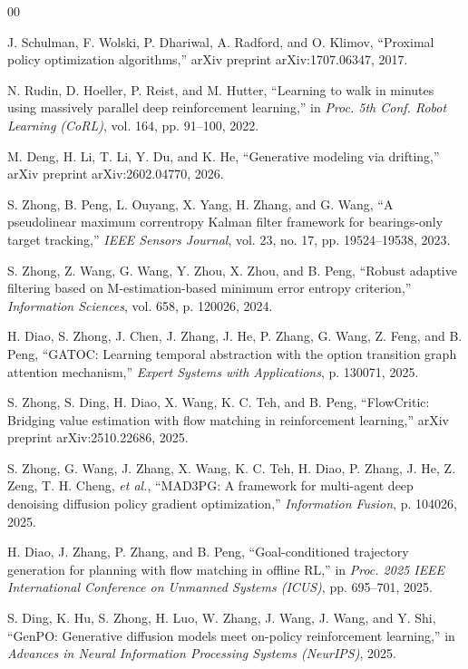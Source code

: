 \documentclass[conference]{IEEEtran}
\begin{document}
\begin{thebibliography}{00}

J. Schulman, F. Wolski, P. Dhariwal, A. Radford, and O. Klimov, 
``Proximal policy optimization algorithms,'' 
arXiv preprint arXiv:1707.06347, 2017.

N. Rudin, D. Hoeller, P. Reist, and M. Hutter, 
``Learning to walk in minutes using massively parallel deep reinforcement learning,'' 
in \emph{Proc. 5th Conf. Robot Learning (CoRL)}, 
vol. 164, pp. 91--100, 2022.

M. Deng, H. Li, T. Li, Y. Du, and K. He, 
``Generative modeling via drifting,'' 
arXiv preprint arXiv:2602.04770, 2026.

S. Zhong, B. Peng, L. Ouyang, X. Yang, H. Zhang, and G. Wang, 
``A pseudolinear maximum correntropy Kalman filter framework for bearings-only target tracking,'' 
\emph{IEEE Sensors Journal}, 
vol. 23, no. 17, pp. 19524--19538, 2023.



S. Zhong, Z. Wang, G. Wang, Y. Zhou, X. Zhou, and B. Peng, 
``Robust adaptive filtering based on M-estimation-based minimum error entropy criterion,'' 
\emph{Information Sciences}, 
vol. 658, p. 120026, 2024.

H. Diao, S. Zhong, J. Chen, J. Zhang, J. He, P. Zhang, G. Wang, Z. Feng, and B. Peng, 
``GATOC: Learning temporal abstraction with the option transition graph attention mechanism,'' 
\emph{Expert Systems with Applications}, 
p. 130071, 2025.

S. Zhong, S. Ding, H. Diao, X. Wang, K. C. Teh, and B. Peng, 
``FlowCritic: Bridging value estimation with flow matching in reinforcement learning,'' 
arXiv preprint arXiv:2510.22686, 2025.

S. Zhong, G. Wang, J. Zhang, X. Wang, K. C. Teh, H. Diao, P. Zhang, J. He, Z. Zeng, T. H. Cheng, \emph{et al.}, 
``MAD3PG: A framework for multi-agent deep denoising diffusion policy gradient optimization,'' 
\emph{Information Fusion}, 
p. 104026, 2025.

H. Diao, J. Zhang, P. Zhang, and B. Peng,
``Goal-conditioned trajectory generation for planning with flow matching in offline RL,''
in \emph{Proc. 2025 IEEE International Conference on Unmanned Systems (ICUS)},
pp. 695--701, 2025.

S. Ding, K. Hu, S. Zhong, H. Luo, W. Zhang, J. Wang, J. Wang, and Y. Shi,
``GenPO: Generative diffusion models meet on-policy reinforcement learning,''
in \emph{Advances in Neural Information Processing Systems (NeurIPS)},
2025.


\end{thebibliography}
\end{document}
